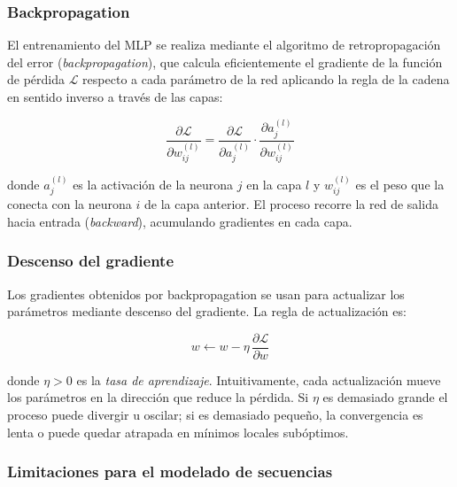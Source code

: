 

\subsubsection*{Backpropagation}

El entrenamiento del MLP se realiza mediante el algoritmo de retropropagación
del error (\textit{backpropagation}), que calcula eficientemente el gradiente
de la función de pérdida $\mathcal{L}$ respecto a cada parámetro de la red
aplicando la regla de la cadena en sentido inverso a través de las capas:

\begin{equation}
    \frac{\partial \mathcal{L}}{\partial w_{ij}^{(l)}} =
    \frac{\partial \mathcal{L}}{\partial a_j^{(l)}} \cdot
    \frac{\partial a_j^{(l)}}{\partial w_{ij}^{(l)}}
\end{equation}

\noindent donde $a_j^{(l)}$ es la activación de la neurona $j$ en la capa $l$
y $w_{ij}^{(l)}$ es el peso que la conecta con la neurona $i$ de la capa
anterior. El proceso recorre la red de salida hacia entrada (\textit{backward}),
acumulando gradientes en cada capa.

\subsubsection*{Descenso del gradiente}

Los gradientes obtenidos por backpropagation se usan para actualizar los
parámetros mediante descenso del gradiente. La regla de actualización es:

\begin{equation}
    w \leftarrow w - \eta \, \frac{\partial \mathcal{L}}{\partial w}
\end{equation}

\noindent donde $\eta > 0$ es la \textit{tasa de aprendizaje}. Intuitivamente,
cada actualización mueve los parámetros en la dirección que reduce la pérdida.
Si $\eta$ es demasiado grande el proceso puede divergir u oscilar; si es
demasiado pequeño, la convergencia es lenta o puede quedar atrapada en
mínimos locales subóptimos.



\subsubsection*{Limitaciones para el modelado de secuencias}

